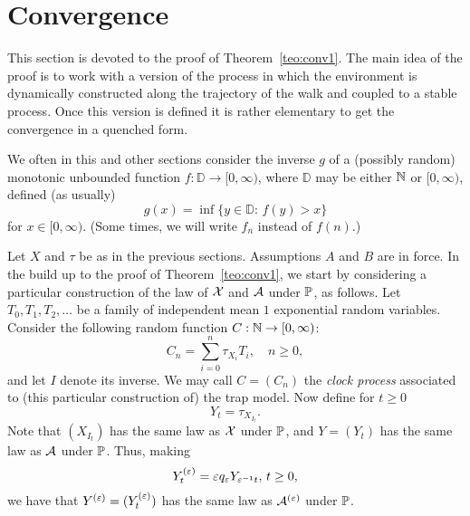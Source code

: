 
\section{Convergence}
\label{sec:conv}

\setcounter{equation}{0}

This section is devoted to the proof of Theorem~\ref{teo:conv1}.
The main idea of the proof is to work with a %
version of the
process in which the environment is dynamically constructed along the
trajectory of the walk and coupled to a stable process. Once
this %
version is defined it is rather elementary to get the
convergence in a quenched form.

 
\begin{rmk}
 \label{rmk:inv}
We often in this and other sections consider the inverse $g$ of 
a (possibly random) monotonic unbounded function 
$f:{\mathbb D}\to[0,\infty)$, where ${\mathbb D}$ may be either 
$\N$ or $[0,\infty)$, defined (as usually)
\begin{equation}
  \label{eq:n}
  g(x)=\inf\{y\in{\mathbb D}:\,f(y)>x\}
\end{equation}
for $x\in[0,\infty)$. (Some times, we will write $f_n$ instead of $f(n)$.)
\end{rmk}

Let $X$ and $\tau$ be as in the previous sections. Assumptions $A$ and $B$ are in force.
In the build up to the proof of Theorem~\ref{teo:conv1}, we start by considering a particular construction of the law of $\X$ and $\E$
under $\P$, as follows.
Let $T_0,T_1,T_2,\ldots$ be a family of independent mean $1$ exponential random variables. Consider the following random function
$C:\N\to[0,\infty)$:
\begin{equation}
\label{eq:clock}
C_n=\sum_{i=0}^n\tau_{X_i} T_i,\quad n\geq0,
\end{equation}
and let $I$ denote its inverse. We may call $C=(C_n)$ the {\em clock process} associated to (this particular construction of) the trap model.
Now define for $t\geq0$
\begin{equation}
\label{eq:y}
Y_t=\tau_{X_{I_t}}.
\end{equation}
Note that $(X_{I_t})$  has the same law as $\X$ under $\P$, and $Y=(Y_t)$ has the same law as $\E$ under $\P$. Thus, making 
\begin{equation} 
\label{eq:yet}
Y^{(\eps)}_t=%
\eps q_\eps Y_{\eps^{-1}t},\,t\geq0,
\end{equation}
we have that $Y^{(\eps)}=(Y^{(\eps)}_t)$ has the same law as $\E^{(\eps)}$ under $\P$. 




